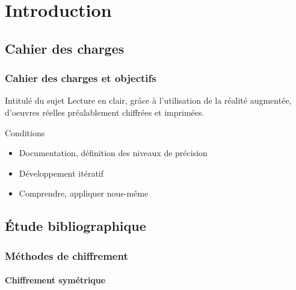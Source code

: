 \section{Introduction}

    \subsection{Cahier des charges}

        \begin{frame}
            \frametitle{Cahier des charges et objectifs}
            \begin{block}{Intitulé du sujet}
                Lecture en clair, grâce à l'utilisation de la réalité augmentée, d'oeuvres réelles préalablement chiffrées et imprimées.
            \end{block}

            \begin{exampleblock}{Conditions}
                \begin{itemize}
                    \item Documentation, définition des niveaux de précision
                    \item Développement itératif
                    \item Comprendre, appliquer nous-même
                \end{itemize}
            \end{exampleblock}
        \end{frame}

    \subsection{Étude bibliographique}

        \begin{frame}
            \frametitle{Méthodes de chiffrement}
            \framesubtitle{Chiffrement symétrique}
        \end{frame}

